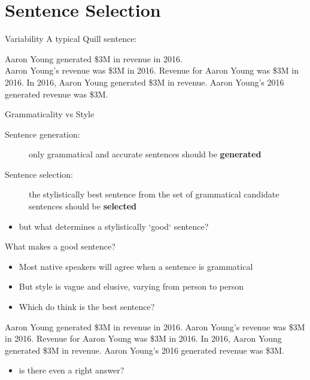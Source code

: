 \documentclass[10pt, compress]{beamer}
\begin{document}
\section{Sentence Selection}
\begin{frame}{Variability}
    A typical Quill sentence:
    \begin{exe}
        \ex \begin{xlist}
            \ex Aaron Young generated \$3M in revenue in 2016. \\ \pause
            \ex Aaron Young's revenue was \$3M in 2016.
            \ex Revenue for Aaron Young was \$3M in 2016.
            \ex In 2016, Aaron Young generated \$3M in revenue.
            \ex Aaron Young's 2016 generated revenue was \$3M.
        \end{xlist}
    \end{exe}
\end{frame}

\begin{frame}{Grammaticality vs Style}
    \begin{description}
        \item[Sentence generation:] only grammatical and accurate sentences should be {\bf generated}
        \item[Sentence selection:] the stylistically best sentence from the set of grammatical candidate sentences should be {\bf selected} \pause
    \end{description}

    \begin{itemize}
        \item but what determines a stylistically `good` sentence?
    \end{itemize}
\end{frame}

\begin{frame}{What makes a good sentence?}
    \begin{itemize}
        \item Most native speakers will agree when a sentence is grammatical
        \item But style is vague and elusive, varying from person to person   \pause
        \item Which do think is the best sentence?
    \end{itemize}

    \begin{exe}
    	\ex \begin{xlist}
	        \ex Aaron Young generated \$3M in revenue in 2016.
	        \ex Aaron Young's revenue was \$3M in 2016.
	        \ex Revenue for Aaron Young was \$3M in 2016.
	        \ex In 2016, Aaron Young generated \$3M in revenue.
	        \ex Aaron Young's 2016 generated revenue was \$3M.
	    \end{xlist}
    \end{exe}

    \pause
    \begin{itemize}
    	\item is there even a right answer?
    \end{itemize}
\end{frame}
\end{document}
